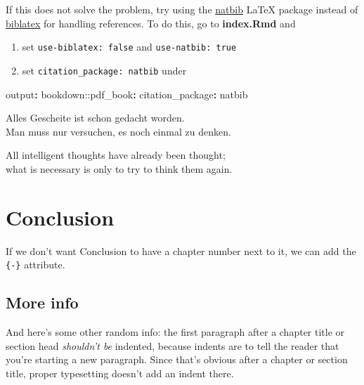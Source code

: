 \documentclass[a4paper, nobind]{templates/ociamthesis}
\providecommand{\tightlist}{%
  \setlength{\itemsep}{0pt}\setlength{\parskip}{0pt}}
\newenvironment{Shaded}{\begin{snugshade}}{\end{snugshade}}
\newcommand{\AttributeTok}[1]{\textcolor[rgb]{0.77,0.63,0.00}{#1}}
\newcommand{\FunctionTok}[1]{\textcolor[rgb]{0.00,0.00,0.00}{#1}}
\newcommand{\KeywordTok}[1]{\textcolor[rgb]{0.13,0.29,0.53}{\textbf{#1}}}
\renewenvironment{Shaded}
{
  \vspace{10pt}%
  \begin{snugshade}%
}{%
  \end{snugshade}%
  \vspace{8pt}%
}
\begin{document}
If this does not solve the problem, try using the \href{https://www.overleaf.com/learn/latex/Bibliography_management_with_natbib}{natbib} LaTeX package instead of \href{https://www.overleaf.com/learn/latex/Articles/Getting_started_with_BibLaTeX}{biblatex} for handling references.
To do this, go to \textbf{index.Rmd} and

\begin{enumerate}
\def\labelenumi{\arabic{enumi}.}
\tightlist
\item
  set \texttt{use-biblatex:\ false} and \texttt{use-natbib:\ true}
\item
  set \texttt{citation\_package:\ natbib} under
\end{enumerate}

\begin{Shaded}
\begin{Highlighting}[]
\FunctionTok{output}\KeywordTok{:}
\AttributeTok{  bookdown:}\FunctionTok{:pdf\_book}\KeywordTok{:}
\AttributeTok{    }\FunctionTok{citation\_package}\KeywordTok{:}\AttributeTok{ natbib}
\end{Highlighting}
\end{Shaded}

\begin{savequote}
Alles Gescheite ist schon gedacht worden.\\
Man muss nur versuchen, es noch einmal zu denken.

All intelligent thoughts have already been thought;\\
what is necessary is only to try to think them again.
\end{savequote}



\hypertarget{conclusion-1}{%
\chapter*{Conclusion}\label{conclusion-1}}

If we don't want Conclusion to have a chapter number next to it, we can add the \texttt{\{-\}} attribute.

\hypertarget{more-info}{%
\section*{More info}\label{more-info}}

And here's some other random info:
the first paragraph after a chapter title or section head \emph{shouldn't be} indented, because indents are to tell the reader that you're starting a new paragraph.
Since that's obvious after a chapter or section title, proper typesetting doesn't add an indent there.
\end{document}
